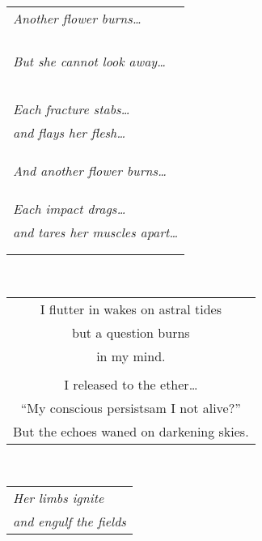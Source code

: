 \documentclass{article}
\begin{document}
\begin{center}
\begin{tabular}{l}
\textit{Another flower burns\ldots} \\
\\
\\
\\
\\
\textit{But she cannot look away\ldots} \\
\\
\\
\\
\\
\\
\textit{Each fracture stabs\ldots} \\
\textit{and flays her flesh\ldots} \\
\\
\\
\\
\textit{And another flower burns\ldots} \\
\\
\\
\\
\textit{Each impact drags\ldots} \\
\textit{and tares her muscles apart\ldots} \\
\\
\\
\end{tabular} \\
\begin{tabular}{c}
\\
I flutter in wakes on astral tides \\
but a question burns \\
in my mind. \\
\\
I released to the ether\ldots{} \\
``My conscious persists\hspace{3ex}am I not alive?'' \\
But the echoes waned on darkening skies. \\
\end{tabular} \\
\begin{tabular}{l}
\\
\textit{Her limbs ignite}\\
\textit{and engulf the fields}\\

\end{tabular}
\end{center}
\end{document}

